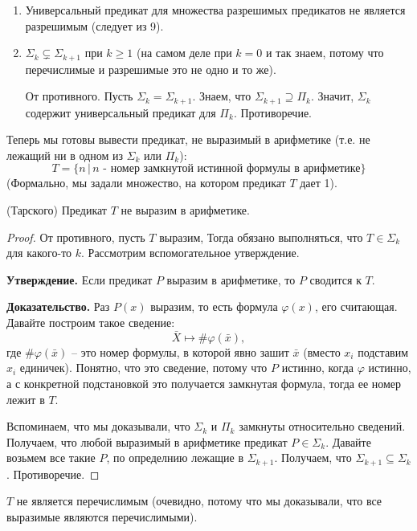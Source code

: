 \begin{enumerate}
    \item Универсальный предикат для множества разрешимых предикатов не является разрешимым (следует из 9).
    \item $\Sigma_k \subsetneq \Sigma_{k+1}$ при $k \geqslant 1$ (на самом деле при $k = 0$ и так знаем, потому что перечислимые и разрешимые это не одно и то же).
    
    От противного. Пусть $\Sigma_k = \Sigma_{k+1}$. Знаем, что $\Sigma_{k+1} \supseteq \Pi_k$. Значит, $\Sigma_k$ содержит универсальный предикат для $\Pi_k$. Противоречие.
\end{enumerate}

Теперь мы готовы вывести предикат, не выразимый в арифметике (т.е. не лежащий ни в одном из $\Sigma_k$ или $\Pi_k$): \[ T = \{ n \,|\, \text{$n$ - номер замкнутой истинной формулы в арифметике} \} \] 
(Формально, мы задали множество, на котором предикат $T$ дает 1).

\vspace*{5mm}

\begin{theorem} (Тарского)
    Предикат $T$ не выразим в арифметике.
\end{theorem}
\begin{proof}
    От противного, пусть $T$ выразим, Тогда обязано выполняться, что $T \in \Sigma_k$ для какого-то $k$. Рассмотрим вспомогательное утверждение.

    \quad \textbf{Утверждение.} Если предикат $P$ выразим в арифметике, то $P$ сводится к $T$. 
    
    \quad \textbf{Доказательство.} Раз $P(x)$ выразим, то есть формула $\varphi(x)$, его считающая. Давайте 
    построим такое сведение: \[ \bar{X} \mapsto \#\varphi(\bar{x}), \] 
    где $\#\varphi(\bar{x})$ -- это номер формулы, в которой явно зашит $\bar{x}$ (вместо $x_i$ подставим $x_i$ единичек). Понятно, что это сведение, потому что $P$ истинно, когда $\varphi$ истинно, а с конкретной подстановкой это получается замкнутая формула, тогда ее номер лежит в $T$. 
    
    Вспоминаем, что мы доказывали, что $\Sigma_k$ и $\Pi_k$ замкнуты относительно сведений. Получаем, что любой выразимый в арифметике предикат $P \in \Sigma_k$. Давайте возьмем все такие $P$, по определнию лежащие в $\Sigma_{k+1}$. Получаем, что $\Sigma_{k+1} \subseteq \Sigma_k$. Противоречие.
\end{proof}

\begin{follow}
    $T$ не является перечислимым (очевидно, потому что мы доказывали, что все выразимые являются перечислимыми).
\end{follow}

